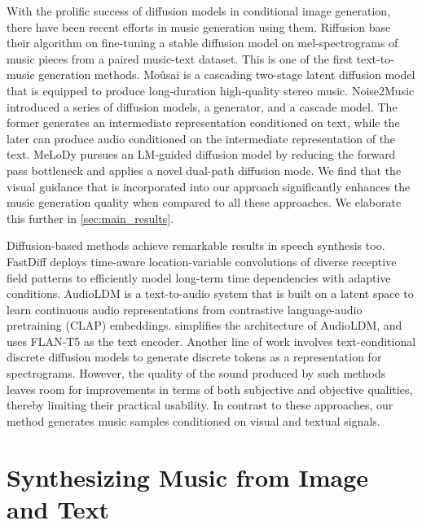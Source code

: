 With the prolific success of diffusion models in conditional image generation, there have been recent efforts in music generation using them. Riffusion \cite{riffusion} base their algorithm on fine-tuning a stable diffusion model \cite{rombach2022high} on mel-spectrograms of music pieces from a paired
music-text dataset. This is one of the first text-to-music generation methods. 
Moûsai \cite{mousai} is a cascading two-stage latent diffusion model that is equipped to produce long-duration high-quality stereo music. 
Noise2Music \cite{noise2music} introduced a series of diffusion models, a generator, and a cascade model. The former generates an intermediate representation
conditioned on text, while the later can produce audio conditioned on the intermediate representation of the text. 
MeLoDy \cite{melody} pursues an LM-guided diffusion model by reducing the forward pass bottleneck and applies a novel dual-path diffusion mode. We find that the visual guidance that is incorporated into our approach significantly enhances the music generation quality when compared to all these approaches. We elaborate this further in \cref{sec:main_results}.

Diffusion-based methods \cite{huang2022generspeech, huang2022prodiff, huang2022fastdiff, popov2021grad, lam2022bddm, lee2021priorgrad} achieve remarkable results in speech synthesis too. FastDiff \cite{huang2022fastdiff} deploys time-aware location-variable convolutions of diverse receptive field patterns to efficiently model long-term time dependencies with adaptive conditions. AudioLDM \cite{audioldm} is a text-to-audio system that is built on a latent space to learn continuous audio representations from contrastive language-audio pretraining (CLAP) embeddings. 
\citet{tango} simplifies the architecture of AudioLDM, and uses FLAN-T5 \cite{flant5} as the text encoder.
Another line of work \cite{yang2023diffsound, garcia2023vampnet} involves text-conditional discrete diffusion models to generate discrete tokens as a representation for spectrograms. However, the quality of the sound produced by such methods leaves room for improvements in terms of both subjective and objective qualities, thereby limiting their practical usability. 
In contrast to these approaches, our method generates music samples conditioned on visual and textual signals. 

\section{Synthesizing Music from Image and Text}
\label{sec:method}

